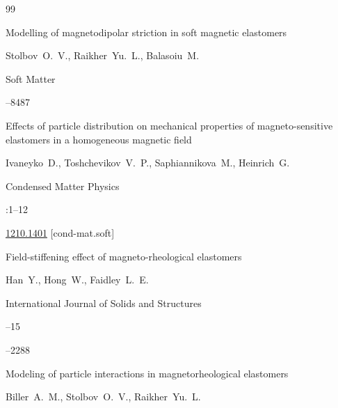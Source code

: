 \begin{thebibliography}{99}




\paper Modelling of magnetodipolar striction in soft magnetic elastomers

\by Stolbov~O.~V., Raikher~Yu.~L., Balasoiu~M.

\jour Soft Matter




--8487







\paper Effects of particle distribution on mechanical properties of magneto-sensitive elastomers in a homogeneous magnetic field

\by Ivaneyko~D., Toshchevikov~V.~P., Saphiannikova~M., Heinrich~G.

\jour Condensed Matter Physics




:1--12


\arxiv \href{https://arxiv.org/abs/1210.1401}{1210.1401} [cond-mat.soft]






\paper Field-stiffening effect of magneto-rheological elastomers

\by Han~Y., Hong~W., Faidley~L.~E.

\jour International Journal of Solids and Structures


--15


--2288





\paper  Modeling of particle interactions in magnetorheological elastomers

\by Biller~A.~M., Stolbov~O.~V., Raikher~Yu.~L.


\end{thebibliography}
